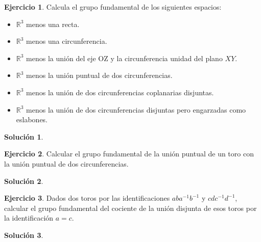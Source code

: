 \documentclass{article}
\theoremstyle{plain}
\theoremstyle{definition}
\newtheorem{exercise}{Ejercicio}
\newtheorem*{sol*}{Solución}
\begin{document}
\newpage

\begin{exercise}

Calcula el grupo fundamental de los siguientes espacios:

\begin{itemize}

\item $\mathbb{R}^3$ menos una recta.

\item $\mathbb{R}^3$ menos una circunferencia.

\item $\mathbb{R}^3$ menos la uni\'on del eje OZ y la circunferencia unidad del plano $XY$.

\item $\mathbb{R}^3$ menos la uni\'on puntual de dos circunferencias.

\item $\mathbb{R}^3$ menos la uni\'on de dos circunferencias coplanarias disjuntas.

\item $\mathbb{R}^3$ menos la uni\'on de dos circunferencias disjuntas pero engarzadas como eslabones.



\end{itemize}

\end{exercise}

\begin{sol*}
\end{sol*}

\newpage

\begin{exercise}

Calcular el grupo fundamental de la uni\'on puntual de un toro con la uni\'on puntual de dos circunferencias.



\end{exercise}

\begin{sol*}
\end{sol*}

\newpage

\begin{exercise}

Dados dos toros por las identificaciones $aba^{-1}b^{-1}$ y $cdc^{-1}d^{-1}$, calcular el grupo fundamental del cociente de la uni\'on disjunta de esos toros por la identificaci\'on $a=c$.

\end{exercise}
\begin{sol*}
\end{sol*}
\end{document}
